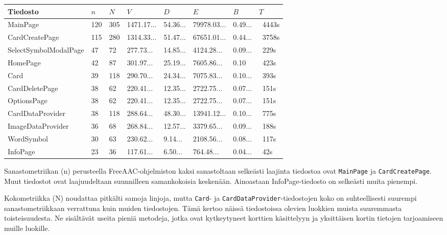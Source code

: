 \documentclass[utf8]{gradu3}
\begin{document}
\begin{center}
    \begin{tabular}{| l | l | l | l | l | l | l | l |}
    \hline
    \textbf{Tiedosto} & \textbf{$n$} & \textbf{$N$} & \textbf{$V$} & \textbf{$D$} & \textbf{$E$} & \textbf{$B$} & \textbf{$T$} \\ \hline
    MainPage & 120 & 305 & 1471.17... & 54.36... & 79978.03... & 0.49... & ~4443s  \\ \hline
    CardCreatePage & 115 & 280 & 1314.33... & 51.47... & 67651.01... & 0.44... & ~3758s \\ \hline
    SelectSymbolModalPage & 47 & 72 & 277.73... & 14.85... & 4124.28... & 0.09... & ~229s \\ \hline
    HomePage & 42 & 87 & 301.97... & 25.19... & 7605.86... & 0.10 & ~423s \\ \hline
    Card & 39 & 118 & 290.70... & 24.34... & 7075.83... & 0.10... & ~393s  \\ \hline
    CardDeletePage & 38 & 62 & 220.41... & 12.35... & 2722.75... & 0.07... & ~151s   \\ \hline
    OptionsPage & 38 & 62 & 220.41... & 12.35... & 2722.75... & 0.07... & ~151s  \\ \hline
    CardDataProvider & 38 & 118 & 288.64... & 48.30... & 13941.12... & 0.10... & ~775s  \\ \hline
    ImageDataProvider & 36 & 68 & 268.84... & 12.57... & 3379.65... & 0.09... & ~188s \\ \hline
    WordSymbol & 30 & 63 & 230.62... & 9.14... & 2108.56... & 0.08... & ~117s  \\ \hline
    InfoPage & 23 & 36 & 117.61... & 6.50... & 764.48... & 0.04... & ~42s  \\ \hline
    \end{tabular}
\end{center}

Sanastometriikan (n) perusteella FreeAAC-ohjelmiston kaksi sanastoltaan selkeästi laajinta tiedostoa ovat \texttt{MainPage} ja \texttt{CardCreatePage}. Muut tiedostot ovat laajuudeltaan suunnilleen samankokoisia keskenään. Ainoastaan InfoPage-tiedosto on selkeästi muita pienempi.

Kokometriikka (N) noudattaa pitkälti samoja linjoja, mutta \texttt{Card}- ja \texttt{CardDataProvider}-tiedostojen koko on suhteellisesti suurempi sanastometriikkaan verrattuna kuin muiden tiedostojen. Tämä kertoo näissä tiedostoissa olevien luokkien muista suuremmasta toisteisuudesta. Ne sisältävät useita pieniä metodeja, jotka ovat kytkeytyneet korttien käsittelyyn ja yksittäisen kortin tietojen tarjoamiseen muille luokille.
\end{document}
